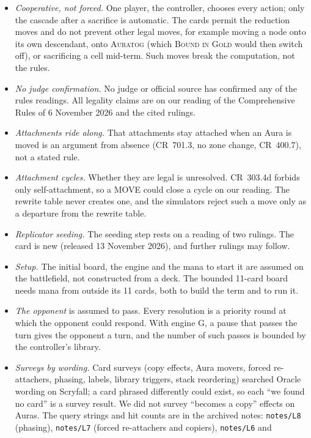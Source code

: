 \documentclass[11pt]{article}
\theoremstyle{definition}
\newcommand{\card}[1]{{\mdseries\scshape #1}}
\newcommand{\CR}[1]{CR~#1}
\begin{document}
\begin{itemize}[nosep,leftmargin=*]
\item \emph{Cooperative, not forced.} One player, the controller, chooses every action;
  only the cascade after a sacrifice is automatic. The cards permit the reduction moves
  and do not prevent other legal moves, for example moving a node onto its own descendant,
  onto \card{Auratog} (which \card{Bound in Gold} would then switch off), or sacrificing a
  cell mid-term. Such moves break the computation, not the rules.
\item \emph{No judge confirmation.} No judge or official source has confirmed any of the
  rules readings. All legality claims are on our reading of the Comprehensive Rules of
  6 November 2026 and the cited rulings.
\item \emph{Attachments ride along.} That attachments stay attached when an Aura is moved
  is an argument from absence (\CR{701.3}, no zone change, \CR{400.7}), not a stated rule.
\item \emph{Attachment cycles.} Whether they are legal is unresolved. \CR{303.4d} forbids
  only self-attachment, so a MOVE could close a cycle on our reading. The rewrite table
  never creates one, and the simulators reject such a move only as a departure from the
  rewrite table.
\item \emph{Replicator seeding.} The seeding step rests on a reading of two rulings. The
  card is new (released 13 November 2026), and further rulings may follow.
\item \emph{Setup.} The initial board, the engine and the mana to start it are assumed on
  the battlefield, not constructed from a deck. The bounded 11-card board needs mana from
  outside its 11 cards, both to build the term and to run it.
\item \emph{The opponent} is assumed to pass. Every resolution is a priority round at
  which the opponent could respond. With engine G, a pause that passes the turn gives the
  opponent a turn, and the number of such passes is bounded by the controller's library.
\item \emph{Surveys by wording.} Card surveys (copy effects, Aura movers, forced
  re-attachers, phasing, labels, library triggers, stack reordering) searched Oracle
  wording on Scryfall; a card phrased differently could exist, so each ``we found no
  card'' is a survey result. We did not survey ``becomes a copy'' effects on Auras. The
  query strings and hit counts are in the archived notes: \texttt{notes/L8} (phasing),
  \texttt{notes/L7} (forced re-attachers and copiers), \texttt{notes/L6} and

\end{itemize}
\end{document}
